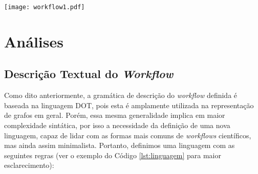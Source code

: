 \documentclass[a4paper,11pt]{article}
\begin{document}
		\begin{minipage}[c]{0.4\textwidth}
			\centering
			
		\end{minipage}%
		\begin{minipage}[c]{0.6\textwidth}
			\centering
			\texttt{[image: workflow1.pdf]}
			\label{fig:pdf}
		\end{minipage}

	\newpage
  \section{Análises}
  	\subsection{Descrição Textual do \emph{Workflow}}
  		Como dito anteriormente, a gramática de descrição do \emph{workflow} definida é baseada na linguagem DOT, pois esta é amplamente utilizada na representação de grafos em geral. Porém, essa mesma generalidade implica em maior complexidade sintática, por isso a necessidade da definição de uma nova linguagem, capaz de lidar com as formas mais comuns de \emph{workflows} científicos, mas ainda assim minimalista. Portanto, definimos uma linguagem com as seguintes regras (ver o exemplo do Código \ref{lst:linguagem} para maior esclarecimento):
\end{document}
